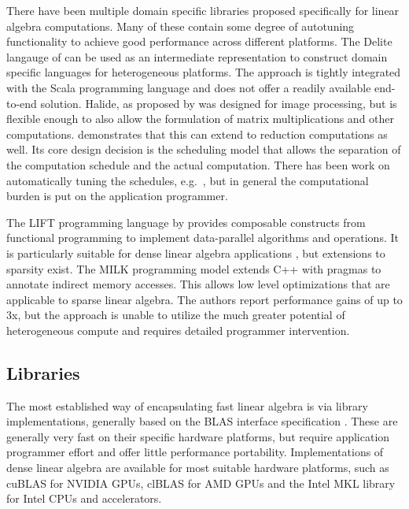     There have been multiple domain specific libraries proposed specifically
    for linear algebra computations.
    Many of these contain some degree of autotuning functionality to achieve
    good performance across different platforms.
    The Delite langauge of \citet{Sujeeth:2014:DCA:2601432.2584665} can be used
    as an intermediate representation to construct domain specific languages for
    heterogeneous platforms.
    The approach is tightly integrated with the Scala programming language
    and does not offer a readily available end-to-end solution.
    Halide, as proposed by \citet{Ragan-Kelley:2013:HLC:2499370.2462176}
    was designed for image processing, but is flexible enough to also allow the 
    formulation of matrix multiplications and other computations.
    \citet{Suriana:2017:PAR:3049832.3049863} demonstrates that this can extend
    to reduction computations as well.
    Its core design decision is the scheduling model that allows the separation
    of the computation schedule and the actual computation.
    There has been work on automatically tuning the schedules, e.g.\ 
    \citet{Mullapudi:2016:ASH:2897824.2925952}, but in general the computational
    burden is put on the application programmer.

    The LIFT programming language by \citet{Steuwer:2015:GPP:2858949.2784754}
    provides composable constructs from functional programming to implement
    data-parallel algorithms and operations.
    It is particularly suitable for dense linear algebra applications
    \citep{Steuwer:2016:MMB:2968455.2968521}, but extensions to sparsity exist.
    The MILK programming model \citep{Kiriansky:2016:OIM:2967938.2967948}
    extends C++ with pragmas to annotate indirect memory accesses.
    This allows low level optimizations that are applicable to sparse linear
    algebra.
    The authors report performance gains of up to 3x, but the approach is unable
    to utilize the much greater potential of heterogeneous compute and requires
    detailed programmer intervention.

\subsection{Libraries}

    The most established way of encapsulating fast linear algebra is via
    library implementations, generally based on the BLAS interface
    specification \cite{2002:USB:567806.567807}.
    These are generally very fast on their specific hardware platforms, but
    require application programmer effort and offer little performance portability.
    Implementations of dense linear algebra are available for most suitable
    hardware platforms, such as cuBLAS \cite{cublas} for NVIDIA GPUs, clBLAS
    \cite{clblas} for AMD GPUs and the Intel MKL library \cite{mkl} for Intel
    CPUs and accelerators.

